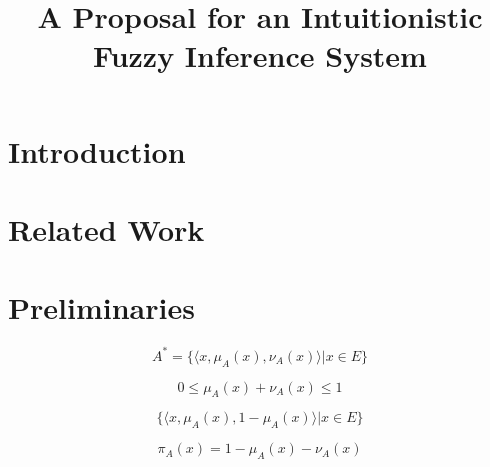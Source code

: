\documentclass[conference]{IEEEtran}
\begin{document}
\title{A Proposal for an Intuitionistic Fuzzy Inference System}


\author{
  }

\maketitle

\begin{abstract}

\end{abstract}

\IEEEpeerreviewmaketitle



\section{Introduction}



\section{Related Work}

\section{Preliminaries}

\begin{equation}
  A^{*} = \{\langle x, \mu _{A} (x), \nu _{A} (x) \rangle | x \in E\}
\end{equation}

\begin{equation}
  0 \leq \mu_{A}(x) + \nu_{A}(x) \leq 1
\end{equation}

\begin{equation}
  \{ \langle x, \mu_{A}(x), 1 - \mu_{A}(x) \rangle | x \in E \}
\end{equation}

\begin{equation}
  \pi_{A}(x) = 1 - \mu_{A}(x) - \nu_{A}(x)
\end{equation}
\end{document}
